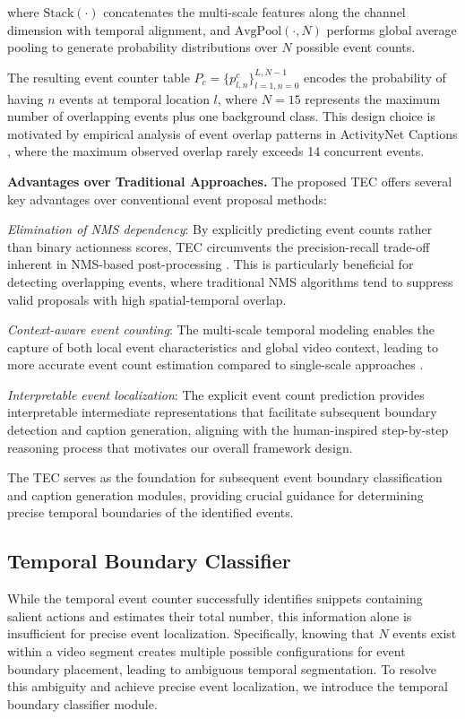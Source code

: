 where $\text{Stack}(\cdot)$ concatenates the multi-scale features along the channel dimension with temporal alignment, and $\text{AvgPool}(\cdot, N)$ performs global average pooling to generate probability distributions over $N$ possible event counts.

The resulting event counter table $P_c = \{p_{l,n}^c\}_{l=1,n=0}^{L, N-1}$ encodes the probability of having $n$ events at temporal location $l$, where $N=15$ represents the maximum number of overlapping events plus one background class. This design choice is motivated by empirical analysis of event overlap patterns in ActivityNet Captions \cite{Krishna2017-pw}, where the maximum observed overlap rarely exceeds 14 concurrent events.

\textbf{Advantages over Traditional Approaches.}
The proposed TEC offers several key advantages over conventional event proposal methods:

\textit{Elimination of NMS dependency}: By explicitly predicting event counts rather than binary actionness scores, TEC circumvents the precision-recall trade-off inherent in NMS-based post-processing \cite{hosang2017learning}. This is particularly beneficial for detecting overlapping events, where traditional NMS algorithms tend to suppress valid proposals with high spatial-temporal overlap.

\textit{Context-aware event counting}: The multi-scale temporal modeling enables the capture of both local event characteristics and global video context, leading to more accurate event count estimation compared to single-scale approaches \cite{yuan2017temporal,long2019gaussian}.

\textit{Interpretable event localization}: The explicit event count prediction provides interpretable intermediate representations that facilitate subsequent boundary detection and caption generation, aligning with the human-inspired step-by-step reasoning process that motivates our overall framework design.

The TEC serves as the foundation for subsequent event boundary classification and caption generation modules, providing crucial guidance for determining precise temporal boundaries of the identified events.



\subsection{Temporal Boundary Classifier}
\label{subsec:method_temporal_boundary_classifier}
While the temporal event counter successfully identifies snippets containing salient actions and estimates their total number, this information alone is insufficient for precise event localization. Specifically, knowing that $N$ events exist within a video segment creates multiple possible configurations for event boundary placement, leading to ambiguous temporal segmentation. To resolve this ambiguity and achieve precise event localization, we introduce the temporal boundary classifier module.

